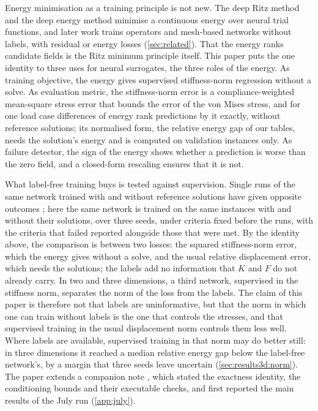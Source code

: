 Energy minimisation as a training principle is not new. The deep Ritz method
\cite{EYu2018} and the deep energy method \cite{Samaniego2020} minimise a continuous energy
over neural trial functions, and later work trains operators and mesh-based networks
without labels, with residual or energy losses
\cite{Xu2024VOL,Eshaghi2025VINO,Lee2025FEONet,Dalton2023,Wurth2024,Wang2026PretrainFEM}
(\cref{sec:related}). That the energy ranks candidate fields is the Ritz minimum principle
itself. This paper puts the one identity to three uses for neural surrogates, the three
roles of the energy. As training objective, the energy gives supervised stiffness-norm
regression without a solve. As evaluation metric, the stiffness-norm error is a
compliance-weighted mean-square stress error that bounds the error of the von Mises stress,
and for one load case differences of energy rank predictions by it exactly, without
reference solutions; its normalised form, the relative energy gap of our tables, needs the
solution's energy and is computed on validation instances only. As failure detector, the
sign of the energy shows whether a prediction is worse than the zero field, and a
closed-form rescaling ensures that it is not.

What label-free training buys is tested against supervision. Single runs of the same
network trained with and without reference solutions have given opposite outcomes
\cite{Dalton2023,MonteiroFernandes2025,Sun2026FEVessel}; here the same network is trained on
the same
instances with and without their solutions, over three seeds, under criteria fixed before
the runs, with the criteria that failed reported alongside those that were met. By the
identity above, the comparison is between two losses: the squared stiffness-norm error,
which the energy gives without a solve, and the usual relative displacement error, which
needs the solutions; the labels add no information that $K$ and $F$ do not already carry.
In two and three dimensions, a third network, supervised in the stiffness norm, separates
the norm of the loss from the labels. The claim of this paper is therefore not that labels
are uninformative, but that the norm in which one can train without labels is the one that
controls the stresses, and that supervised training in the usual displacement norm controls
them less well. Where labels are available, supervised training in that norm may do better
still: in three dimensions it reached a median relative energy gap below the label-free
network's, by a margin that three seeds leave uncertain (\cref{sec:results3d:norm}). The
paper extends a companion note \cite{CaoSong2026}, which stated the
exactness identity, the conditioning bounds and their executable checks, and first reported
the main results of the July run (\ref{app:july}).

